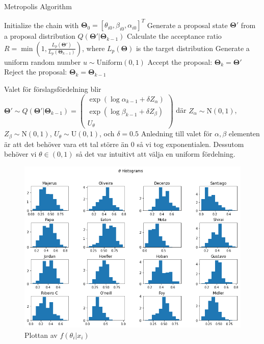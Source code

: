\documentclass{assignment}
\begin{document}
\begin{algorithm}
    \caption{Metropolis Algorithm}
    \begin{algorithmic}[1]
    \State Initialize the chain with  $\mathbf{\Theta}_0=[\theta_{i0},\beta_{i0},\alpha_{i0}]^T$
     
    \State Generate a proposal state $\mathbf{\Theta}'$ from a proposal distribution $Q(\mathbf{\Theta}' | \mathbf{\Theta}_{k-1})$
    \State Calculate the acceptance ratio $R = \min\left(1, \frac{L_p(\mathbf{\Theta}')}{L_p(\mathbf{\Theta}_{k-1})}\right)$, where $L_p(\mathbf{\Theta})$ is the target distribution
    \State Generate a uniform random number $u \sim \text{Uniform}(0, 1)$
    \State Accept the proposal: $\mathbf{\Theta}_k = \mathbf{\Theta}' $
    \Else
    \State Reject the proposal: $\mathbf{\Theta}_{k}  = \mathbf{\Theta}_{k-1}$
    \EndIf
    \EndFor
    \end{algorithmic}
\end{algorithm}
Valet för förslagsfördelning blir $\mathbf{\Theta}'\sim Q(\mathbf{\Theta}'|\mathbf{\Theta}_{k-1}) = 
\begin{pmatrix}
    \exp(\log \alpha_{k-1} + \delta Z_\alpha)
    \\ \exp(\log \beta_{k-1} + \delta Z_\beta)
    \\ U_\theta
\end{pmatrix}$
där $Z_\alpha \sim \text{N}(0,1)$, $Z_\beta \sim \text{N}(0,1)$, $U_\theta \sim \text{U}(0,1)$, och $\delta = 0.5$
Anledning till valet för $\alpha,\beta$ elementen är att det behöver vara ett tal större än 0 så vi tog exponentialen. Dessutom behöver
vi $\theta\in (0,1)$ så det var intuitivt att välja en uniform fördelning.
\begin{figure}
    \includegraphics[width=200mm]{assets/mcmc_theta.png}
    \caption[short]{Plottan av $f(\theta_i|x_i)$}
\end{figure}
\end{document}
